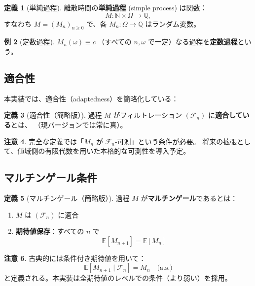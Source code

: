 \documentclass[a4paper,12pt]{ltjsarticle}
\theoremstyle{definition}
\newtheorem{definition}{定義}[section]
\newtheorem{example}[definition]{例}
\newtheorem{remark}[definition]{注意}
\begin{document}
\begin{definition}[単純過程]
離散時間の\textbf{単純過程} (simple process) は関数：
\[
  M : \mathbb{N} \times \Omega \to \mathbb{Q},
\]
すなわち $M = (M_n)_{n \geq 0}$ で、各 $M_n : \Omega \to \mathbb{Q}$ はランダム変数。
\end{definition}

\begin{example}[定数過程]
$M_n(\omega) \equiv c$ （すべての $n, \omega$ で一定）なる過程を\textbf{定数過程}という。
\end{example}

\subsection{適合性}

本実装では、適合性（adaptedness）を簡略化している：

\begin{definition}[適合性（簡略版）]
過程 $M$ がフィルトレーション $(\mathcal{F}_n)$ に\textbf{適合している}とは、
（現バージョンでは常に真）。
\end{definition}

\begin{remark}
完全な定義では「$M_n$ が $\mathcal{F}_n$-可測」という条件が必要。
将来の拡張として、値域側の有限代数を用いた本格的な可測性を導入予定。
\end{remark}

\subsection{マルチンゲール条件}

\begin{definition}[マルチンゲール（簡略版）]
過程 $M$ が\textbf{マルチンゲール}であるとは：
\begin{enumerate}
  \item $M$ は $(\mathcal{F}_n)$ に適合
  \item \textbf{期待値保存}：すべての $n$ で
  \[
    \mathbb{E}[M_{n+1}] = \mathbb{E}[M_n]
  \]
\end{enumerate}
\end{definition}

\begin{remark}
古典的には条件付き期待値を用いて：
\[
  \mathbb{E}[M_{n+1} \mid \mathcal{F}_n] = M_n \quad \text{(a.s.)}
\]
と定義される。本実装は全期待値のレベルでの条件（より弱い）を採用。
\end{remark}
\end{document}
